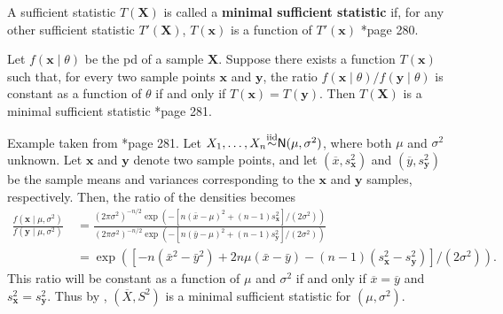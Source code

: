 \begin{defe} \label{defe: minimal_sufficient_statistic}
    A sufficient statistic $T(\bm{X})$ is called a {\bf minimal sufficient statistic} if, for any other sufficient statistic $T'(\bm{X})$, $T(\bm{x})$ is a function of $T'(\bm{x})$ \cite{CasellaGeorge2001SI}*{page 280}.
\end{defe}

\begin{thm} \label{thm: mss_ratio_test}
    Let $f(\bm{x} \mid \theta)$ be the pd of a sample $\bm{X}$. Suppose there exists a function $T(\bm{x})$ such that, for every two sample points $\bm{x}$ and $\bm{y}$, the ratio $f(\bm{x} \mid \theta) / f(\bm{y} \mid \theta)$ is constant as a function of $\theta$ if and only if $T(\bm{x}) = T(\bm{y})$. Then $T(\bm{X})$ is a minimal sufficient statistic \cite{CasellaGeorge2001SI}*{page 281}.
\end{thm}

\begin{exam} \label{exam: norm_min_ss}
    Example taken from \cite{CasellaGeorge2001SI}*{page 281}. Let $X_1 , \ldots , X_n {\overset{\text{iid}}{\sim}} {\sf N} (\mu , \sigma^2)$, where both $\mu$ and $\sigma^2$ unknown. Let $\bm{x}$ and $\bm{y}$ denote two sample points, and let $(\overline{x}, s_{\bm{x}}^2)$ and $(\overline{y}, s_{\bm{y}}^2)$ be the sample means and variances corresponding to the $\bm{x}$ and $\bm{y}$ samples, respectively. Then, the ratio of the densities becomes
    \begin{align*}
        \frac{f\left(\mathbf{x} \mid \mu, \sigma^{2}\right)}{f\left(\mathbf{y} \mid \mu, \sigma^{2}\right)} \
         & =\frac{\left(2 \pi \sigma^{2}\right)^{-n / 2} \exp \left(-\left[n(\bar{x}-\mu)^{2}+(n-1) s_{\mathbf{x}}^{2}\right] /\left(2 \sigma^{2}\right)\right)}{\left(2 \pi \sigma^{2}\right)^{-n / 2} \exp \left(-\left[n(\bar{y}-\mu)^{2}+(n-1) s_{\mathbf{y}}^{2}\right] /\left(2 \sigma^{2}\right)\right)} \\
         & =\exp \left(\left[-n\left(\bar{x}^{2}-\bar{y}^{2}\right)+2 n \mu(\bar{x}-\bar{y})-(n-1)\left(s_{\mathbf{x}}^{2}-s_{\mathbf{y}}^{2}\right)\right] /\left(2 \sigma^{2}\right)\right) .
    \end{align*}
    This ratio will be constant as a function of $\mu$ and $\sigma^2$ if and only if $\overline{x}=\overline{y}$ and $s_{\bm{x}}^2 = s_{\bm{y}}^2$. Thus by , $(\overline{X}, S^2)$ is a minimal sufficient statistic for $(\mu , \sigma^2 )$.
\end{exam}

